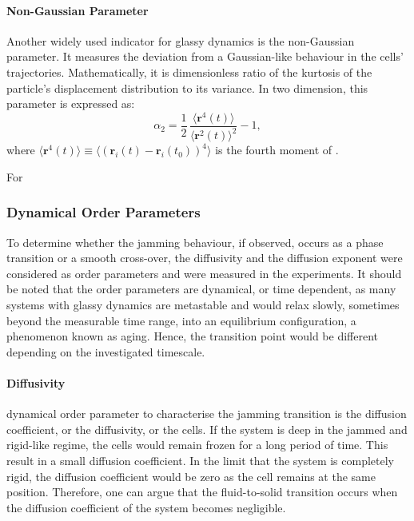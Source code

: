 \documentclass[a4paper,12pt]{article}
\begin{document}
\paragraph{Non-Gaussian Parameter}
Another widely used indicator for glassy dynamics is the non-Gaussian parameter. It measures the deviation from a Gaussian-like behaviour in the cells' trajectories. Mathematically, it is dimensionless ratio of the kurtosis of the particle's displacement distribution to its variance. In two dimension, this parameter is expressed as:
\begin{equation}
\alpha_2 = \frac{1}{2}\,\frac{\langle{\bm{r}^4(t)\rangle}}{\langle{\bm{r}^2(t)\rangle}^2} - 1,
\end{equation}
where $\langle{\bm{r}^4(t)\rangle} \equiv \langle{\left(\bm{r}_i(t) - \bm{r}_i(t_0)\right)^4\rangle}$ is the fourth moment of . 

For 

\subsubsection{Dynamical Order Parameters}
To determine whether the jamming behaviour, if observed, occurs as a phase transition or a smooth cross-over, the diffusivity and the diffusion exponent were considered as order parameters and were measured in the experiments. It should be noted that the order parameters are dynamical, or time dependent, as many systems with glassy dynamics are metastable and would relax slowly, sometimes beyond the measurable time range, into an equilibrium configuration, a phenomenon known as aging. Hence, the transition point would be different depending on the investigated timescale.

\paragraph{Diffusivity}
 dynamical order parameter to characterise the jamming transition is the diffusion coefficient, or the diffusivity, or the cells. If the system is deep in the jammed and rigid-like regime, the cells would remain frozen for a long period of time. This result in a small diffusion coefficient. In the limit that the system is completely rigid, the diffusion coefficient would be zero as the cell remains at the same position. Therefore, one can argue that the fluid-to-solid transition occurs when the diffusion coefficient of the system becomes negligible. 
 
\end{document}
